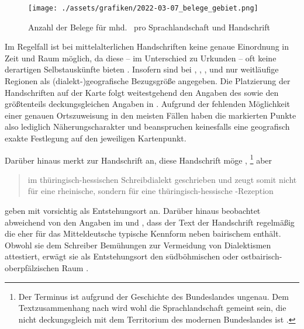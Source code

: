 \begin{figure}
\centering
\texttt{[image: ./assets/grafiken/2022-03-07\_belege\_gebiet.png]}
\caption[Anzahl der Belege für mhd.\  pro Sprachlandschaft und
Handschrift]{Anzahl der Belege für mhd.\  pro Sprachlandschaft
und Handschrift\nocite{wiesinger1983:rede}}
\label{fig:kartebelegzahl}
\end{figure}

Im Regelfall ist bei mittelalterlichen Handschriften keine genaue Einordnung in
Zeit und Raum möglich, da diese -- im Unterschied zu Urkunden -- oft keine
derartigen Selbstauskünfte bieten
\autocites[1309--1310]{wegera2000}[117--121]{bein2011}. Insofern sind bei
\citet{kc:C1}, \citet{kc:H}, \citet{kc:M}, \citet{kc:P} und \citet{kc:VB} nur
weitläufige Regionen als (dialekt-)geografische Bezugsgröße angegeben.%
Die Platzierung der Handschriften auf der Karte folgt weitestgehend den Angaben
des  \nosh\autocite{hsc} sowie den größtenteils deckungsgleichen
Angaben in \citet{kcdigital,wolf:kckat}. Aufgrund der fehlenden Möglichkeit
einer genauen Ortszuweisung in den meisten Fällen haben die markierten Punkte
also lediglich Näherungscharakter und beanspruchen keinesfalls eine geografisch
exakte Festlegung auf den jeweiligen Kartenpunkt.

Darüber hinaus merkt \citet{klein1988} zur Handschrift \citet{kc:H} an, diese
Handschrift möge ,%
%
	\footnote{Der Terminus  ist aufgrund der Geschichte des
	Bundeslandes ungenau. Dem Textzusammenhang nach wird wohl die
	Sprachlandschaft gemeint sein, die nicht deckungsgleich mit dem Territorium
	des modernen Bundeslandes ist \autocite[vgl.~z.\,B.][853]{wiesinger1983}.}
%
aber \blockcquote[118]{klein1988}{im thüringisch-hessischen Schreibdialekt
geschrieben und zeugt somit nicht für eine rheinische, sondern für eine
thüringisch-hessische \nocite{schroeder1895}-Rezeption}.
\textcites{kcdigital}[23]{wolf:kckat} geben mit
\citet[237--238]{millerzimmermann2007} vorsichtig  als
Entstehungsort an.
%
\label{phsec:vbherkunft}%
Darüber hinaus beobachtet \citeauthor{schneider1987} abweichend von den
Angaben im  und \citet{kcdigital}, dass der Text der Handschrift
\citet{kc:VB} regelmäßig die eher für das Mitteldeutsche typische Kennform
  neben bairischem  enthält. Obwohl sie dem
Schreiber Bemühungen zur Vermeidung von Dialektismen attestiert, erwägt sie als
Entstehungsort den südböhmischen oder ostbairisch-oberpfälzischen Raum
\autocite[226]{schneider1987}.

